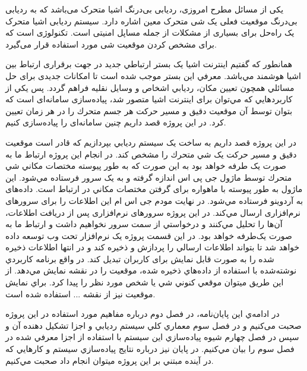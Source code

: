یکی از مسائل مطرح امروزی، ردیابی بی‌درنگ اشیا متحرک می‌باشد که به ردیابی بی‌درنگ موقعیت فعلی یک شی متحرک معین اشاره دارد. 
سیستم ردیابی اشیا متحرک یک راه‌حل برای بسیاری از مشکلات از جمله مساپل امنیتی است. تکنولوژی است که برای مشخص کردن موقعیت شی مورد استفاده قرار می‌گیرد.


همانطور كه گفتيم اينترنت اشيا يک بستر ارتباطي جديد در جهت برقراری ارتباط بين اشيا هوشمند مي‌باشد. معرفي اين بستر موجب شده است تا امکانات جديدی برای حل مسائلي همچون تعيين مکان، رديابي اشخاص و وسايل نقليه فراهم گردد. پس يکي از كاربردهايي كه مي‌توان برای اينترنت اشيا متصور شد، پياده‌سازی سامانه‌ای است كه بتوان توسط آن موقعيت دقيق و مسير حركت هر جسم متحرك را در هر زمان تعيين كرد. در اين پروژه قصد داريم چنين سامانه‌ای را پياده‌سازی كنيم.


در اين پروژه قصد داريم به ساخت يک سيستم رديابي بپردازيم كه قادر است موقعيت دقيق و مسير حركت يک شي متحرك را مشخص كند. در انجام اين پروژه ارتباط ما به صورت يک طرفه خواهد بود به اين صورت كه به طور پيوسته مختصات مکاني شي متحرك توسط ماژول جی پی اس  اندازه گرفته و به يک سرور فرستاده مي‌شود. اين ماژول به طور پيوسته با ماهواره برای گرفتن مختصات مکاني در ارتباط است. داده‌های  به آردوينو فرستاده مي‌شود. در نهايت مودم جی اس ام  اين اطلاعات را برای سرورهای نرم‌افزاری ارسال مي‌كند. در اين پروژه سرورهای نرم‌افزاری پس از دريافت اطلاعات، آن‌ها را تحليل مي‌كنند و درخواستي از سمت سرور نخواهيم داشت و ارتباط ما به صورت يک‌طرفه خواهد بود. در اين قسمت پروژه يک نرم‌افزار تحت وب توسعه داده خواهد شد تا
بتواند اطلاعات ارسالي را پردازش و ذخيره كند و در انتها اطلاعات ذخيره شده را به صورت قابل نمايش برای كاربران تبديل كند. در واقع برنامه كاربردي نوشته‌شده با استفاده از داده‌هاي ذخیره شده، موقعيت را در نقشه نمايش مي‌دهد. از اين طريق ميتوان موقعي كنوني شي يا شخص مورد نظر را پيدا كرد. براي نمايش موقعيت نيز از نقشه ... استفاده شده است.


در ادامه‌ي اين پايان‌نامه، در فصل دوم درباره مفاهیم مورد استفاده در این پروژه صحبت می‌کنیم و در فصل سوم معماري كلي سيستم رديابي و اجزا تشكيل دهنده آن و سپس در فصل چهارم شيوه پياده‌سازي اين سيستم با استفاده از اجزا معرفي شده در فصل سوم را بيان مي‌كنيم. در پايان نيز درباره نتايج پياده‌سازي سيستم و كارهايي كه در آينده مبتني بر اين پروژه ميتوان انجام داد صحبت مي‌كنيم.


   